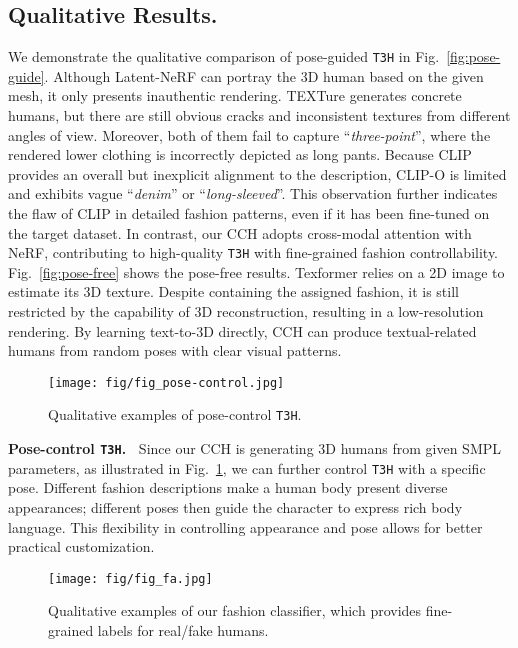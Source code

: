 \documentclass[11pt]{article}
\begin{document}
\subsection{Qualitative Results.}
We demonstrate the qualitative comparison of pose-guided \texttt{T3H} in Fig.~\ref{fig:pose-guide}. Although Latent-NeRF can portray the 3D human based on the given mesh, it only presents inauthentic rendering. TEXTure generates concrete humans, but there are still obvious cracks and inconsistent textures from different angles of view. Moreover, both of them fail to capture ``\textit{three-point}'', where the rendered lower clothing is incorrectly depicted as long pants. Because CLIP provides an overall but inexplicit alignment to the description, CLIP-O is limited and exhibits vague ``\textit{denim}'' or ``\textit{long-sleeved}''. This observation further indicates the flaw of CLIP in detailed fashion patterns, even if it has been fine-tuned on the target dataset. In contrast, our CCH adopts cross-modal attention with NeRF, contributing to high-quality \texttt{T3H} with fine-grained fashion controllability. Fig.~\ref{fig:pose-free} shows the pose-free results. Texformer relies on a 2D image to estimate its 3D texture. Despite containing the assigned fashion, it is still restricted by the capability of 3D reconstruction, resulting in a low-resolution rendering. By learning text-to-3D directly, CCH can produce textual-related humans from random poses with clear visual patterns.

\begin{figure}[t]
\centering
    \texttt{[image: fig/fig\_pose-control.jpg]}
    \vspace{-1ex}
    \caption{Qualitative examples of pose-control \texttt{T3H}.}
    \vspace{-3ex}
    \label{fig:pose-control}
\end{figure}

\vspace{1ex} \noindent \textbf{Pose-control \texttt{T3H}.~}
Since our CCH is generating 3D humans from given SMPL parameters, as illustrated in Fig.~\ref{fig:pose-control}, we can further control \texttt{T3H} with a specific pose. Different fashion descriptions make a human body present diverse appearances; different poses then guide the character to express rich body language. This flexibility in controlling appearance and pose allows for better practical customization.

\begin{figure}[t]
\centering
    \texttt{[image: fig/fig\_fa.jpg]}
    \vspace{-1ex}
    \caption{Qualitative examples of our fashion classifier, which provides fine-grained labels for real/fake humans.}
    \vspace{-3ex}
    \label{fig:fa}
\end{figure}
\end{document}
